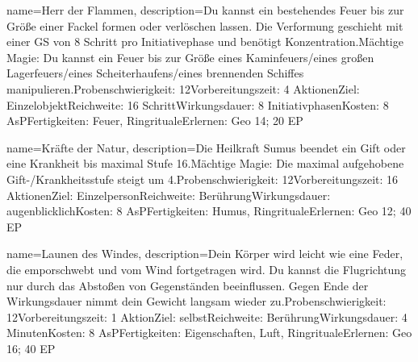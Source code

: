 {
    name={Herr der Flammen},
    description={Du kannst ein bestehendes Feuer bis zur Größe einer Fackel formen oder verlöschen lassen. Die Verformung geschieht mit einer GS von 8 Schritt pro Initiativephase und benötigt Konzentration.\newline Mächtige Magie: Du kannst ein Feuer bis zur Größe eines Kaminfeuers/eines großen Lagerfeuers/eines Scheiterhaufens/eines brennenden Schiffes manipulieren.\newline Probenschwierigkeit: 12\newline Vorbereitungszeit: 4 Aktionen\newline Ziel: Einzelobjekt\newline Reichweite: 16 Schritt\newline Wirkungsdauer: 8 Initiativphasen\newline Kosten: 8 AsP\newline Fertigkeiten: Feuer, Ringrituale\newline Erlernen: Geo 14; 20 EP}
}


{
    name={Kräfte der Natur},
    description={Die Heilkraft Sumus beendet ein Gift oder eine Krankheit bis maximal Stufe 16.\newline Mächtige Magie: Die maximal aufgehobene Gift-/Krankheitsstufe steigt um 4.\newline Probenschwierigkeit: 12\newline Vorbereitungszeit: 16 Aktionen\newline Ziel: Einzelperson\newline Reichweite: Berührung\newline Wirkungsdauer: augenblicklich\newline Kosten: 8 AsP\newline Fertigkeiten: Humus, Ringrituale\newline Erlernen: Geo 12; 40 EP}
}


{
    name={Launen des Windes},
    description={Dein Körper wird leicht wie eine Feder, die emporschwebt und vom Wind fortgetragen wird. Du kannst die Flugrichtung nur durch das Abstoßen von Gegenständen beeinflussen. Gegen Ende der Wirkungsdauer nimmt dein Gewicht langsam wieder zu.\newline Probenschwierigkeit: 12\newline Vorbereitungszeit: 1 Aktion\newline Ziel: selbst\newline Reichweite: Berührung\newline Wirkungsdauer: 4 Minuten\newline Kosten: 8 AsP\newline Fertigkeiten: Eigenschaften, Luft, Ringrituale\newline Erlernen: Geo 16; 40 EP}
}


